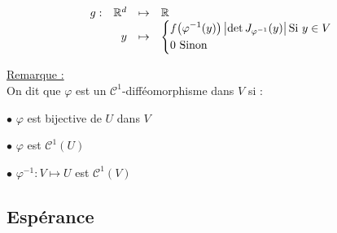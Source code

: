 \documentclass[12pt]{article}
\newif\ifcorrection
\newcommand{\corr}[1]{\ifcorrection{\color{lightblue}#1\color{black}}\fi}
\newcommand{\petitespace}{\vspace{0.5cm}}
\newcommand{\shift}{\hspace{2em}}
\newcommand{\bb}[1]{\mathbb{#1}} %
\newcommand{\R}{\bb{R}} %
\newcommand{\Rq}{\underline{Remarque :} \\}
\renewcommand{\cal}{\mathcal}
\newcommand{\1}{\bb{1}} %
\begin{document}
$$
\begin{array}{rrrl}
g : & \mathbb{R}^d & \mapsto & \mathbb{R} \\
    & y         & \mapsto & \left\{
        \begin{aligned}
            & f\big(\varphi^{-1}(y)\big)  \left| \det J_{\varphi^{-1}}(y) \right| \text{Si $ y \in V$}\\
            & 0 \text{ Sinon}
        \end{aligned}
    \right.
\end{array}
$$
\petitespace

\corr{\textbf{preuve : }

$\forall A \in \cal B(\R^d)$, on a 

\begin{align*}
P(\varphi(X) \in A)&=P(\varphi(X) \in A, X \in U) + P(\varphi(X) \in A, X \notin U)\\
	&=P(\varphi(X) \in A, X \in U)\\
	&=P(X\in \varphi^{-1}(A)\cap U)\\
	&=\int_{\varphi^{-1}(A)\cap U}f(x)dx\\
	&=\int_U f(x)\1_{x \in \varphi^{-1}(A)}dx\\
\end{align*}

On effectue le changement de variable $y=\varphi(x), y \in V$ $ x=\varphi^{-1}(y)$ et donc $dx=|det J_{\varphi^{-1}(y)}|$
et on obtient 

\begin{align*}
	P(\varphi(X) \in A)&=\int_U f(x)\1_{x \in \varphi^{-1}(A)}dx\\
	&=\int_V f\big(\varphi^{-1}(y)\big)|det J_{\varphi^{-1}(y)}|\1_{y \in A}dy\\
	&=\int_A f\big(\varphi^{-1}(y)\big)|det J_{\varphi^{-1}(y)}|\1_{y \in V}dy \\
	&=\int_A g(y)dy
\end{align*}
}

\Rq 

On dit que $\varphi$ est un $\cal C^1$-difféomorphisme dans $V$ si : \petitespace

\shift $\bullet$ $\varphi$ est bijective de $U$ dans $V$ \petitespace

\shift $\bullet$ $\varphi$ est $\cal C^1(U)$  \petitespace

\shift $\bullet$ $\varphi^{-1} : V \mapsto U$ est $\cal C^1(V)$

\petitespace


\subsection{Espérance}\petitespace
\end{document}
